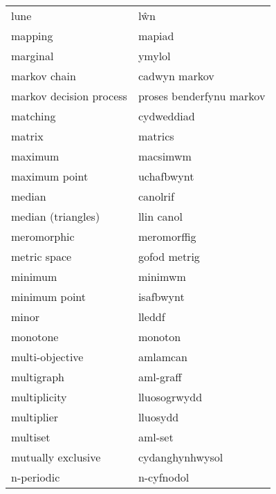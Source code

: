 \begin{supertabular}{p{0.22\textwidth}p{0.22\textwidth}}
                            lune &                             lŵn \\
                         mapping &                          mapiad \\
                        marginal &                          ymylol \\
                    markov chain &                   cadwyn markov \\
         markov decision process &        proses benderfynu markov \\
                        matching &                      cydweddiad \\
                          matrix &                         matrics \\
                         maximum &                        macsimwm \\
                   maximum point &                      uchafbwynt \\
                          median &                        canolrif \\
              median (triangles) &                      llin canol \\
                     meromorphic &                     meromorffig \\
                    metric space &                    gofod metrig \\
                         minimum &                         minimwm \\
                   minimum point &                       isafbwynt \\
                           minor &                          lleddf \\
                        monotone &                         monoton \\
                 multi-objective &                        amlamcan \\
                      multigraph &                       aml-graff \\
                    multiplicity &                    lluosogrwydd \\
                      multiplier &                        lluosydd \\
                        multiset &                         aml-set \\
              mutually exclusive &                 cydanghynhwysol \\
                      n-periodic &                      n-cyfnodol \\

\end{supertabular}
